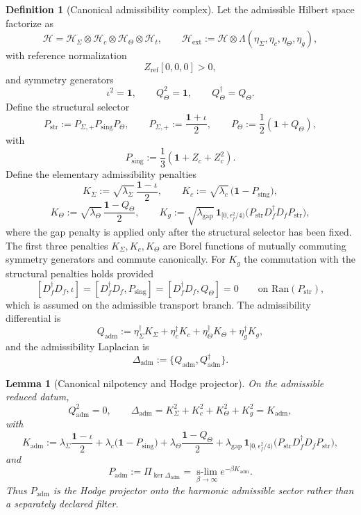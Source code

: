 \documentclass[11pt,a4paper]{article}
\newtheorem{lemma}[theorem]{Lemma}
\theoremstyle{definition}
\newtheorem{definition}[theorem]{Definition}
\theoremstyle{remark}
\newcommand{\Seam}{\Sigma}
\newcommand{\inv}{\iota}
\newcommand{\Kadm}{K_{\mathrm{adm}}}
\newcommand{\Padm}{P_{\mathrm{adm}}}
\begin{document}
\begin{definition}[Canonical admissibility complex]
\label{def:admissibility-complex}
Let the admissible Hilbert space factorize as
\[
\mathcal H=\mathcal H_{\Seam}\otimes\mathcal H_c\otimes\mathcal H_\Theta\otimes\mathcal H_t,
\qquad
\mathcal H_{\mathrm{ext}}
:=
\mathcal H\otimes\Lambda(\eta_\Sigma,\eta_c,\eta_\Theta,\eta_g),
\]
with reference normalization
\[
Z_{\mathrm{ref}}[0,0,0]>0,
\]
and symmetry generators
\[
\inv^2=\mathbf 1,
\qquad
Q_\Theta^2=\mathbf 1,
\qquad
Q_\Theta^\dagger=Q_\Theta.
\]
Define the structural selector
\[
P_{\mathrm{str}}:=P_{\Seam,+}P_{\mathrm{sing}}P_\Theta,
\qquad
P_{\Seam,+}:=\frac{\mathbf 1+\inv}{2},
\qquad
P_\Theta:=\frac12(\mathbf 1+Q_\Theta),
\]
with
\[
P_{\mathrm{sing}}:=\frac13(\mathbf 1+Z_c+Z_c^2).
\]
Define the elementary admissibility penalties
\[
K_\Sigma:=\sqrt{\lambda_\Sigma}\,\frac{\mathbf 1-\inv}{2},
\qquad
K_c:=\sqrt{\lambda_c}\,\bigl(\mathbf 1-P_{\mathrm{sing}}\bigr),
\]
\[
K_\Theta:=\sqrt{\lambda_\Theta}\,\frac{\mathbf 1-Q_\Theta}{2},
\qquad
K_g:=\sqrt{\lambda_{\mathrm{gap}}}\,\mathbf 1_{[0,\epsilon_f^2/4)}\!\bigl(P_{\mathrm{str}}D_f^\dagger D_f P_{\mathrm{str}}\bigr),
\]
where the gap penalty is applied only after the structural selector has been fixed.
The first three penalties $K_\Sigma,K_c,K_\Theta$ are Borel functions of mutually commuting
symmetry generators and commute canonically. For $K_g$ the commutation with the structural
penalties holds provided
\[
[D_f^\dagger D_f,\inv]=[D_f^\dagger D_f,P_{\mathrm{sing}}]=[D_f^\dagger D_f,Q_\Theta]=0
\qquad
\text{on }\mathrm{Ran}(P_{\mathrm{str}}),
\]
which is assumed on the admissible transport branch. The admissibility differential is
\[
Q_{\mathrm{adm}}
:=
\eta_\Sigma^\dagger K_\Sigma
+\eta_c^\dagger K_c
+\eta_\Theta^\dagger K_\Theta
+\eta_g^\dagger K_g,
\]
and the admissibility Laplacian is
\[
\Delta_{\mathrm{adm}}:=\{Q_{\mathrm{adm}},Q_{\mathrm{adm}}^\dagger\}.
\]
\end{definition}

\begin{lemma}[Canonical nilpotency and Hodge projector]
\label{lem:admissibility-nilpotency}
\label{lem:hodge-admissibility-projector}
On the admissible reduced datum,
\[
Q_{\mathrm{adm}}^2=0,
\qquad
\Delta_{\mathrm{adm}}
=
K_\Sigma^2+K_c^2+K_\Theta^2+K_g^2
=
\Kadm,
\]
with
\[
\Kadm
:=
\lambda_\Sigma\frac{\mathbf 1-\inv}{2}
+\lambda_c\bigl(\mathbf 1-P_{\mathrm{sing}}\bigr)
+\lambda_\Theta\frac{\mathbf 1-Q_\Theta}{2}
+\lambda_{\mathrm{gap}}\,\mathbf 1_{[0,\epsilon_f^2/4)}\!\bigl(P_{\mathrm{str}}D_f^\dagger D_f P_{\mathrm{str}}\bigr),
\]
and
\[
\Padm
:=
\Pi_{\ker\Delta_{\mathrm{adm}}}
=
\operatorname*{s-lim}_{\beta\to\infty}e^{-\beta\Kadm}.
\]
Thus $\Padm$ is the Hodge projector onto the harmonic admissible sector rather than a
separately declared filter.
\end{lemma}
\end{document}
